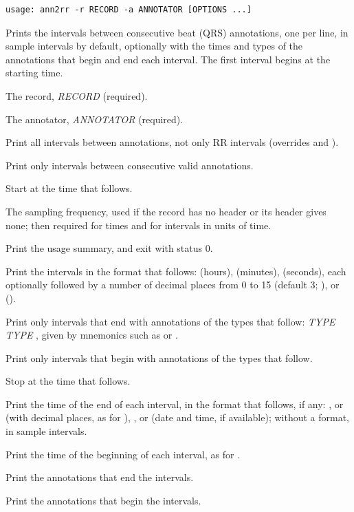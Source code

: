 \begin{lstlisting}[style=signature,language={}]
usage: ann2rr -r RECORD -a ANNOTATOR [OPTIONS ...]
\end{lstlisting}
Prints the intervals between consecutive beat (QRS) annotations, one per line, in sample
intervals by default, optionally with the times and types of the annotations that begin and
end each interval. The first interval begins at the starting time.
\begin{params}
\item[-r] The record, \textit{RECORD} (required).
\item[-a] The annotator, \textit{ANNOTATOR} (required).
\item[-A] Print all intervals between annotations, not only RR intervals (overrides 
  and ).
\item[-c] Print only intervals between consecutive valid annotations.
\item[-f] Start at the time that follows.
\item[-F] The sampling frequency, used if the record has no header or its header gives
  none; then required for times and for intervals in units of time.
\item[-h] Print the usage summary, and exit with status 0.
\item[-i] Print the intervals in the format that follows:  (hours), 
  (minutes),  (seconds), each optionally followed by a number of decimal places from
  0 to 15 (default 3; ), or  ().
\item[-p] Print only intervals that end with annotations of the types that follow:
   \textit{TYPE} \code{[}\textit{TYPE} \code{...]}, given by mnemonics such as
   or .
\item[-P] Print only intervals that begin with annotations of the types that follow.
\item[-t] Stop at the time that follows.
\item[-v] Print the time of the end of each interval, in the format that follows, if any:
  ,  or  (with decimal places, as for ), , or
   (date and time, if available); without a format, in sample intervals.
\item[-V] Print the time of the beginning of each interval, as for .
\item[-w] Print the annotations that end the intervals.
\item[-W] Print the annotations that begin the intervals.
\end{params}
